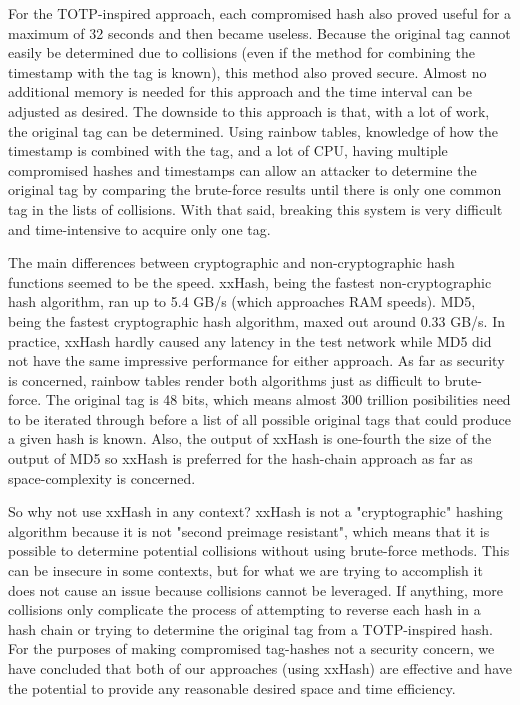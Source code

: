 \documentclass[12pt]{article} %
\begin{document}
For the TOTP-inspired approach, each compromised hash also proved useful for a maximum of 32 seconds and then became useless. Because the original tag cannot easily be determined due to collisions (even if the method for combining the timestamp with the tag is known), this method also proved secure. Almost no additional memory is needed for this approach and the time interval can be adjusted as desired. The downside to this approach is that, with a lot of work, the original tag can be determined. Using rainbow tables, knowledge of how the timestamp is combined with the tag, and a lot of CPU, having multiple compromised hashes and timestamps can allow an attacker to determine the original tag by comparing the brute-force results until there is only one common tag in the lists of collisions. With that said, breaking this system is very difficult and time-intensive to acquire only one tag.

The main differences between cryptographic and non-cryptographic hash functions seemed to be the speed. xxHash, being the fastest non-cryptographic hash algorithm, ran up to 5.4 GB/s (which approaches RAM speeds). MD5, being the fastest cryptographic hash algorithm, maxed out around 0.33 GB/s. In practice, xxHash hardly caused any latency in the test network while MD5 did not have the same impressive performance for either approach. As far as security is concerned, rainbow tables render both algorithms just as difficult to brute-force. The original tag is 48 bits, which means almost 300 trillion posibilities need to be iterated through before a list of all possible original tags that could produce a given hash is known. Also, the output of xxHash is one-fourth the size of the output of MD5 so xxHash is preferred for the hash-chain approach as far as space-complexity is concerned.

So why not use xxHash in any context? xxHash is not a "cryptographic" hashing algorithm because it is not "second preimage resistant", which means that it is possible to determine potential collisions without using brute-force methods. This can be insecure in some contexts, but for what we are trying to accomplish it does not cause an issue because collisions cannot be leveraged. If anything, more collisions only complicate the process of attempting to reverse each hash in a hash chain or trying to determine the original tag from a TOTP-inspired hash. For the purposes of making compromised tag-hashes not a security concern, we have concluded that both of our approaches (using xxHash) are effective and have the potential to provide any reasonable desired space and time efficiency.








\end{document}
